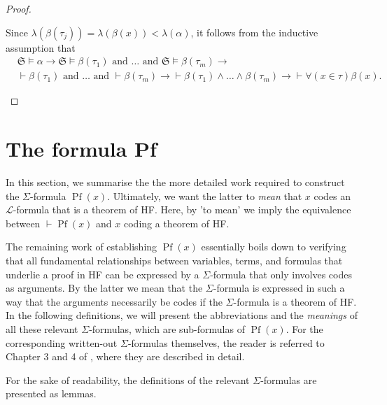 \begin{proof}
\begin{itemize}
$$        $$
        Since $\lambda(\beta(\tau_j)) = \lambda(\beta(x)) < \lambda(\alpha)$, it follows 
        from the inductive assumption that
        \begin{equation*}
            \begin{split}
                & \mathfrak{S} \vDash \alpha \rightarrow 
                \mathfrak{S} \vDash \beta(\tau_1) \text{ and } \ldots \text{ and } 
                \mathfrak{S} \vDash \beta(\tau_m) \rightarrow \\
                &\vdash \beta(\tau_1) \text{ and } \ldots \text{ and } \vdash \beta(\tau_m) 
                \rightarrow
                \vdash \beta(\tau_1) \land \ldots \land \beta(\tau_m) \rightarrow
                \vdash \forall (x \in \tau) \beta(x).
            \end{split}
        \end{equation*}
    \end{itemize}
\end{proof}

\section{The formula Pf}

In this section, we summarise the the more detailed work required to construct the 
$\Sigma$-formula $\operatorname{Pf}(x)$.
Ultimately, we want the latter to \textit{mean} that $x$ codes an $\mathcal{L}$-formula 
that is a theorem of HF.
Here, by 'to mean' we imply the equivalence between $\vdash \operatorname{Pf}(x)$ and
$x$ coding a theorem of HF.

The remaining work of establishing $\operatorname{Pf}(x)$ essentially boils down to verifying 
that all fundamental relationships between variables, terms, and formulas that 
underlie a proof in HF can be expressed by a $\Sigma$-formula that only involves codes as arguments.
By the latter we mean that the $\Sigma$-formula is expressed in such a way that the arguments 
necessarily be codes if the $\Sigma$-formula is a theorem of HF.
In the following definitions, 
we will present the abbreviations and the \textit{meanings} of all these relevant 
$\Sigma$-formulas, which are sub-formulas of $\operatorname{Pf}(x)$.
For the corresponding written-out $\Sigma$-formulas themselves, the reader is
referred to Chapter 3 and 4 of \cite{swierczkowski2003finite}, where they are described in detail.

For the sake of readability, the definitions of the relevant $\Sigma$-formulas are presented
as lemmas.

